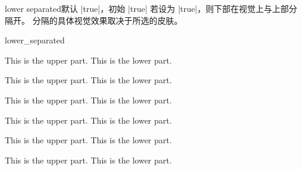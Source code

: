 \clearpage
\begin{docTcbKey}{lower separated}{}{默认 |true|，初始 |true|}
若设为 |true|，则下部在视觉上与上部分隔开。
分隔的具体视觉效果取决于所选的皮肤。
\enlargethispage*{1cm}
\begin{exdispExample}{lower_separated}
\begin{tcbraster}[colback=red!5!white,colframe=red!75!black,
  fonttitle=\bfseries,fontlower=\itshape]
%
\begin{tcolorbox}[title=Lower separated]
This is the upper part.
\tcblower
This is the lower part.
\end{tcolorbox}
%
\begin{tcolorbox}[title=Lower not separated,lower separated=false]
This is the upper part.
\tcblower
This is the lower part.
\end{tcolorbox}
%
\begin{tcolorbox}[sidebyside,title=Lower separated]
This is the upper part.
\tcblower
This is the lower part.
\end{tcolorbox}
%
\begin{tcolorbox}[sidebyside,title=Lower not separated,lower separated=false]
This is the upper part.
\tcblower
This is the lower part.
\end{tcolorbox}
%
\begin{tcolorbox}[beamer,title=Lower separated]
This is the upper part.
\tcblower
This is the lower part.
\end{tcolorbox}
%
\begin{tcolorbox}[beamer,title=Lower not separated,lower separated=false]
This is the upper part.
\tcblower
This is the lower part.
\end{tcolorbox}
%
\end{tcbraster}
\end{exdispExample}
\end{docTcbKey}



